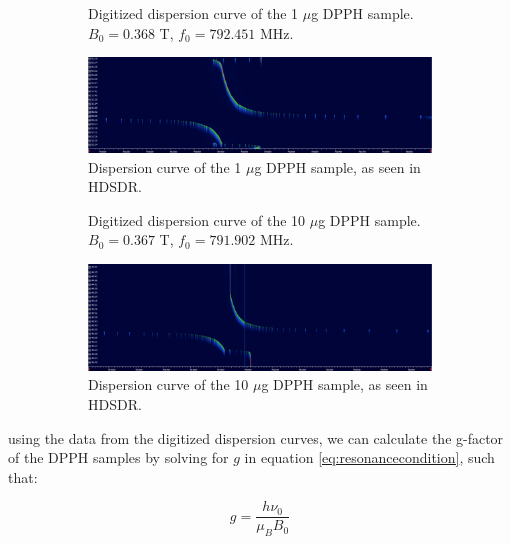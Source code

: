 \documentclass{article}
\begin{document}
\begin{figure}[h]
	\centering
	\begin{subfigure}[t]{0.45\textwidth}
		\centering
		\scalebox{0.45}{}
		\caption{Digitized dispersion curve of the 1 $\mu$g DPPH sample. $B_0 = 0.368$ T, $f_0 = 792.451$ MHz.}
		\label{fig:DPPH1mgDigitized}
	\end{subfigure}
	\hfill
	\begin{subfigure}[t]{0.45\textwidth}
		\centering
		\includegraphics[width=\textwidth]{Figures/Task 4/DPPH1mg.png}
		\caption{Dispersion curve of the 1 $\mu$g DPPH sample, as seen in HDSDR.}
		\label{fig:DPPH1mg}
	\end{subfigure}
	\begin{subfigure}[t]{0.45\textwidth}
		\centering
		\scalebox{0.45}{}
		\caption{Digitized dispersion curve of the 10 $\mu$g DPPH sample. $B_0 = 0.367$ T, $f_0 = 791.902$ MHz.}
		\label{fig:DPPH10mgDigitized}
	\end{subfigure}
	\hfill
	\begin{subfigure}[t]{0.45\textwidth}
		\centering
		\includegraphics[width=\textwidth]{Figures/Task 4/DPPH10mg.png}
		\caption{Dispersion curve of the 10 $\mu$g DPPH sample, as seen in HDSDR.}
		\label{fig:DPPH10mg}
	\end{subfigure}
	\caption{}
	\label{fig:DPPHPlots}
\end{figure}

using the data from the digitized dispersion curves, we can calculate the g-factor of the DPPH samples by solving for $g$ in equation \ref{eq:resonancecondition}, such that:

\begin{equation*}
	g = \frac{h \nu_0}{\mu_B B_0}
\end{equation*}
\end{document}
